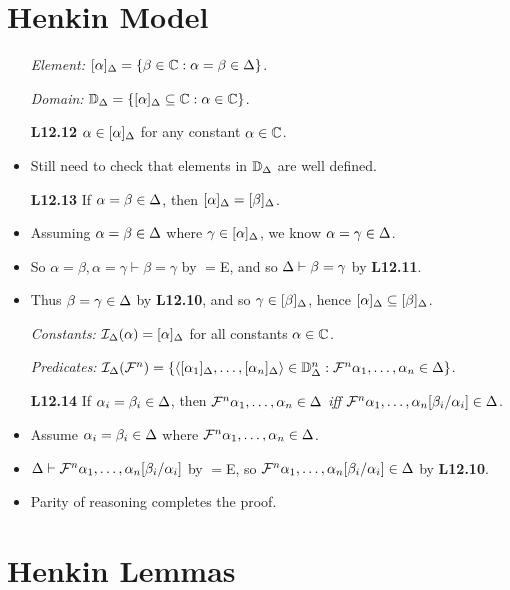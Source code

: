 \documentclass[a4paper, 11pt]{article} %
\begin{document}
\section*{Henkin Model}

\begin{itemize}
  \item[\it Element:] $[\alpha]_{\Delta}=\lbrace\beta\in\mathbb{C} : \alpha=\beta\in\Delta\rbrace$.
  \item[\it Domain:] $\mathbb{D}_{\Delta}=\lbrace[\alpha]_{\Delta} \subseteq \mathbb{C} : \alpha\in\mathbb{C}\rbrace$.
  \item[\bf L12.12] $\alpha\in[\alpha]_{\Delta}$ for any constant $\alpha\in\mathbb{C}$.
    \item Still need to check that elements in $\mathbb{D}_{\Delta}$ are well defined. 
  \item[\bf L12.13] If $\alpha=\beta\in\Delta$, then $[\alpha]_{\Delta}=[\beta]_{\Delta}$.
  \item Assuming $\alpha=\beta\in\Delta$ where $\gamma\in[\alpha]_{\Delta}$, we know $\alpha=\gamma\in\Delta$.
  \item So $\alpha=\beta,\alpha=\gamma\vdash\beta=\gamma$ by $=$E, and so $\Delta\vdash\beta=\gamma$ by \textbf{L12.11}.
  \item Thus $\beta=\gamma\in\Delta$ by \textbf{L12.10}, and so $\gamma\in[\beta]_{\Delta}$, hence $[\alpha]_{\Delta}\subseteq[\beta]_{\Delta}$.
  \item[\it Constants:] $\mathcal{I}_{\Delta}(\alpha)=[\alpha]_{\Delta}$ for all constants $\alpha\in\mathbb{C}$.
  \item[\it Predicates:] $\mathcal{I}_{\Delta}(\mathcal{F}^n)=\lbrace\langle[\alpha_1]_{\Delta},\ldots,[\alpha_n]_{\Delta}\rangle\in\mathbb{D}_{\Delta}^n:\mathcal{F}^n\alpha_1,\ldots,\alpha_n\in\Delta\rbrace$.
  \item[\bf L12.14] If $\alpha_i=\beta_i\in\Delta$, then $\mathcal{F}^n\alpha_1,\ldots,\alpha_n\in\Delta$ \textit{iff} $\mathcal{F}^n\alpha_1,\ldots,\alpha_n[\beta_i/\alpha_i]\in\Delta$.
    \setcounter{enumi}{0}
  \item Assume $\alpha_i=\beta_i\in\Delta$ where $\mathcal{F}^n\alpha_1,\ldots,\alpha_n\in\Delta$.
  \item $\Delta\vdash\mathcal{F}^n\alpha_1,\ldots,\alpha_n[\beta_i/\alpha_i]$ by $=$E, so $\mathcal{F}^n\alpha_1,\ldots,\alpha_n[\beta_i/\alpha_i]\in\Delta$ by \textbf{L12.10}.
  \item Parity of reasoning completes the proof.
\end{itemize}




\section*{Henkin Lemmas}
\end{document}
